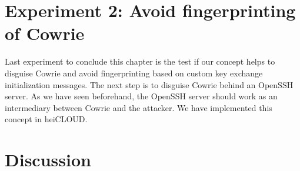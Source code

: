 \section{Experiment 2: Avoid fingerprinting of Cowrie}

\begin{figure}
    
\end{figure}

Last experiment to conclude this chapter is the test if our concept helps to disguise Cowrie and avoid fingerprinting based on custom key exchange initialization messages.
The next step is to disguise Cowrie behind an OpenSSH server.
As we have seen beforehand, the OpenSSH server should work as an intermediary between Cowrie and the attacker.
We have implemented this concept in heiCLOUD.

\section{Discussion}

